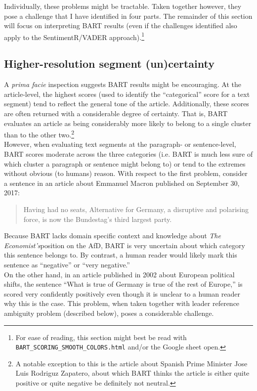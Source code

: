 \documentclass[11pt, letterpaper, twoside]{article}
\begin{document}
    Individually, these problems might be tractable. Taken together however, they pose a challenge that I have identified in four parts. The remainder of this section will focus on interpreting BART results (even if the challenges identified also apply to the SentimentR/VADER approach).\footnote{For ease of reading, this section might best be read with \texttt{BART\_SCORING\_SMOOTH\_COLORS.html} and/or the Google sheet open.}
    
    \subsection{Higher-resolution segment (un)certainty}
        A \textit{prima facie} inspection suggests BART results might be encouraging. At the article-level, the highest scores (used to identify the ``categorical'' score for a text segment) tend to reflect the general tone of the article. Additionally, these scores are often returned with a considerable degree of certainty. That is, BART evaluates an article as being considerably more likely to belong to a single cluster than to the other two.\footnote{A notable exception to this is the article about Spanish Prime Minister Jose Luis Rodriguz Zapatero, about which BART thinks the article is either quite positive or quite negative be definitely not neutral.}\\

        However, when evaluating text segments at the paragraph- or sentence-level, BART scores moderate across the three categories (i.e. BART is much less sure of which cluster a paragraph or sentence might belong to) or tend to the extremes without obvious (to humans) reason. With respect to the first problem, consider a sentence in an article about Emmanuel Macron published on September 30, 2017:
        
        \begin{quote}
            Having had no seats, Alternative for Germany, a disruptive and polarising force, is now the Bundestag's third largest party.
        \end{quote}

        Because BART lacks domain specific context and knowledge about \textit{The Economist's}position on the AfD, BART is very uncertain about which category this sentence belongs to. By contrast, a human reader would likely mark this sentence as ``negative'' or ``very negative.''\\

        On the other hand, in an article published in 2002 about European political shifts, the sentence ``What is true of Germany is true of the rest of Europe,'' is scored very confidently positively even though it is unclear to a human reader why this is the case. This problem, when taken together with leader reference ambiguity problem (described below), poses a considerable challenge.
\end{document}
